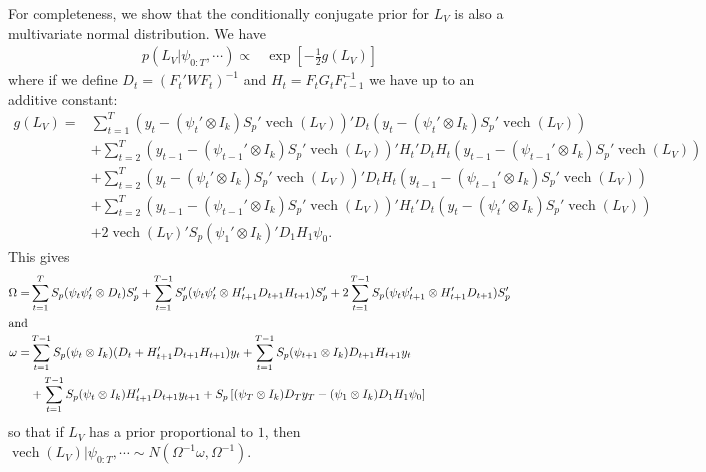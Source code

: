 \documentclass{article}
\DeclareMathOperator{\vech}{vech}
\begin{document}
For completeness, we show that the conditionally conjugate prior for $L_V$ is also a multivariate normal distribution. We have
\begin{align*}
  p(L_V|\psi_{0:T},\cdots)\propto & \exp\left[-\frac{1}{2}g(L_V)\right]
\end{align*}
where if we define $D_t=(F_t'WF_t)^{-1}$ and $H_t=F_tG_tF_{t-1}^{-1}$ we have up to an additive constant:
\begin{align*}
  g(L_V) = & \sum_{t=1}^T\left(y_t - (\psi_t' \otimes I_k)S_p'\vech(L_V)\right)'D_t\left(y_t - (\psi_t' \otimes I_k)S_p'\vech(L_V)\right) \\
  & + \sum_{t=2}^T\left(y_{t-1} - (\psi_{t-1}' \otimes I_k )S_p'\vech(L_V)\right)'H_t'D_tH_t\left(y_{t-1} - (\psi_{t-1}' \otimes I_k )S_p'\vech(L_V)\right)\\
  & + \sum_{t=2}^T\left(y_t - (\psi_t'\otimes I_k)S_p'\vech(L_V)\right)'D_tH_t\left(y_{t-1} - (\psi_{t-1}'\otimes I_k)S_p'\vech(L_V)\right) \\
  & + \sum_{t=2}^T\left(y_{t-1} - (\psi_{t-1}'\otimes I_k)S_p'\vech(L_V)\right)'H_t'D_t\left(y_t - (\psi_t'\otimes I_k)S_p'\vech(L_V)\right)\\
  & + 2\vech(L_V)'S_p(\psi_1'\otimes I_k)'D_1H_1\psi_0.
\end{align*}
This gives
\begin{align*}
  \Omega = & \sum_{t=1}^TS_p(\psi_t\psi_t'\otimes D_t)S_p' + \sum_{t=1}^{T-1}S_p'(\psi_t\psi_t'\otimes H_{t+1}'D_{t+1}H_{t+1})S_p' + 2\sum_{t=1}^{T-1}S_p(\psi_t\psi_{t+1}'\otimes H_{t+1}'D_{t+1})S_p'\\
  \intertext{and}
  \omega = & \sum_{t=1}^{T-1}S_p(\psi_t\otimes I_k)(D_t + H_{t+1}'D_{t+1}H_{t+1})y_t + \sum_{t=1}^{T-1}S_p(\psi_{t+1}\otimes I_k)D_{t+1}H_{t+1}y_t\\
  & +\sum_{t=1}^{T-1}S_p(\psi_t\otimes I_k)H_{t+1}'D_{t+1}y_{t+1}  + S_p\left[(\psi_T\otimes I_k)D_Ty_T - (\psi_1\otimes I_k)D_1H_1\psi_0\right]
\end{align*}
so that if $L_V$ has a prior proportional to $1$, then $\vech(L_V)|\psi_{0:T},\cdots \sim N(\Omega^{-1}\omega, \Omega^{-1})$. 




\end{document}
